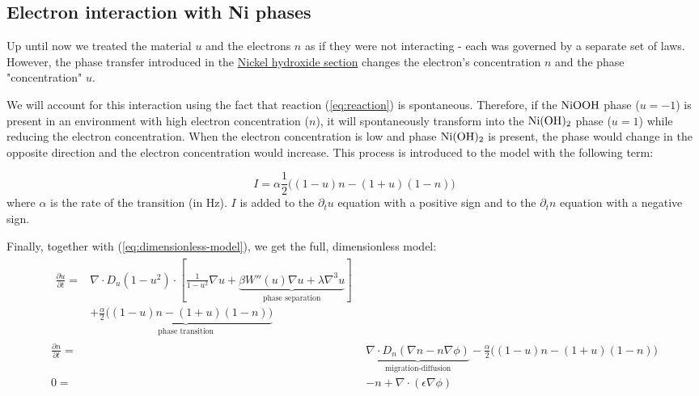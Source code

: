 \documentclass[12pt]{article}
\begin{document}
\subsection{Electron interaction with Ni phases} \label{sec:electron-material}
Up until now we treated the material $u$ and the electrons $n$ as if they were not interacting - each was governed by a separate set of laws. However, the phase transfer introduced in the \hyperref[sec:Nickel hydroxide]{Nickel hydroxide section} changes the electron's concentration $n$ and the phase "concentration" $u$.

We will account for this interaction using the fact that reaction (\ref{eq:reaction}) is spontaneous. Therefore, if the $\ce{NiOOH}$ phase ($u=-1$) is present in an environment with high electron concentration ($n$), it will spontaneously transform into the $\ce{Ni(OH)_2}$ phase ($u=1$) while reducing the electron concentration. When the electron concentration is low and phase $\ce{Ni(OH)_2}$ is present, the phase would change in the opposite direction and the electron concentration would increase. This process is introduced to the model with the following term:

\begin{equation}
    I = \alpha \frac{1}{2} \big( (1-u)n - (1+u)(1-n) \big)
\end{equation}
where $\alpha$ is the rate of the transition (in Hz). $I$ is added to the $\partial_t u$ equation with a positive sign and to the $\partial_t n$ equation with a negative sign.

Finally, together with (\ref{eq:dimensionless-model}), we get the full, dimensionless model:
\begin{subequations} \label{eq:full-model}
    \begin{align} 
        \begin{split}
        \frac{\partial u}{\partial t} ={}& \nabla  \cdot D_u (1-u^2) \cdot \left[ \frac{1}{1-u^2}\nabla u + \underbrace{\beta W''(u)\nabla u + \lambda \nabla ^3 u}_{\text{phase separation}} \right] \\
        & + \underbrace{\frac{\alpha}{2} \big( (1-u)n - (1+u)(1-n) \big)}_{\text{phase transition}}
        \end{split}\\
        \frac{\partial n}{\partial t} ={}& \underbrace{\nabla \cdot D_n(\nabla n - n\nabla \phi)}_{\text{migration-diffusion}} - \frac{\alpha}{2} \big( (1-u)n - (1+u)(1-n) \big)\\
    0 ={}& -n + \nabla \cdot (\epsilon \nabla \phi)
    \end{align}
\end{subequations}
\end{document}
